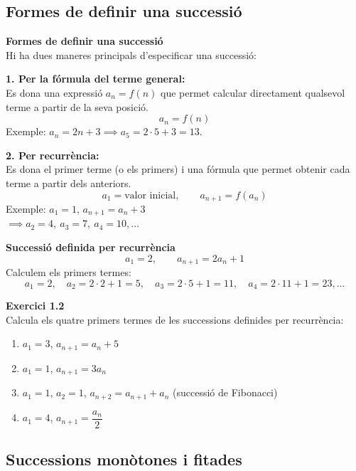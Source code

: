 \documentclass[12pt]{article}
\begin{document}
\subsection{Formes de definir una successió}

\begin{concept}
\textbf{Formes de definir una successió}\\
Hi ha dues maneres principals d'especificar una successió:

\textbf{1. Per la fórmula del terme general:}\\
Es dona una expressió $a_n = f(n)$ que permet calcular directament qualsevol terme a partir de la seva posició.
\[
a_n = f(n)
\]
Exemple: $a_n = 2n + 3 \implies a_5 = 2 \cdot 5 + 3 = 13$.

\textbf{2. Per recurrència:}\\
Es dona el primer terme (o els primers) i una fórmula que permet obtenir cada terme a partir dels anteriors.
\[
a_1 = \text{valor inicial}, \qquad a_{n+1} = f(a_n)
\]
Exemple: $a_1 = 1$, $a_{n+1} = a_n + 3$ \\
$\implies a_2 = 4, \ a_3 = 7, \ a_4 = 10, \dots$
\end{concept}

\begin{exemple}
\textbf{Successió definida per recurrència}
\[
a_1 = 2, \qquad a_{n+1} = 2 a_n + 1
\]
Calculem els primers termes:
\[
a_1 = 2, \quad a_2 = 2 \cdot 2 + 1 = 5, \quad a_3 = 2 \cdot 5 + 1 = 11, \quad a_4 = 2 \cdot 11 + 1 = 23, \dots
\]
\end{exemple}

\begin{exercici}
\textbf{Exercici 1.2}\\
Calcula els quatre primers termes de les successions definides per recurrència:
\begin{enumerate}[label=\alph*)]
    \item $a_1 = 3$, $a_{n+1} = a_n + 5$
    \item $a_1 = 1$, $a_{n+1} = 3 a_n$
    \item $a_1 = 1$, $a_2 = 1$, $a_{n+2} = a_{n+1} + a_n$ (successió de Fibonacci)
    \item $a_1 = 4$, $a_{n+1} = \dfrac{a_n}{2}$
\end{enumerate}
\end{exercici}

\subsection{Successions monòtones i fitades}
\end{document}
